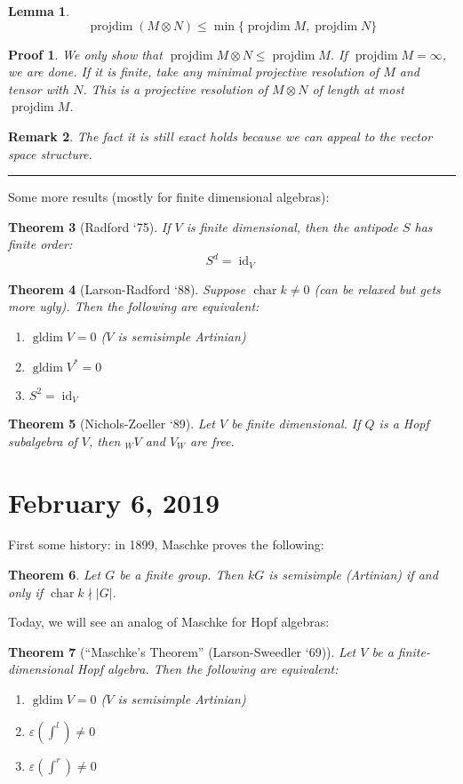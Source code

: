 \documentclass[12pt]{article}
\theoremstyle{break}
\theoremstyle{nonumberbreak}
\theoremstyle{changebreak}
\newtheorem{thm}{Theorem}[subsection]
\newtheorem{lem}[thm]{Lemma}
\theoremstyle{break}
\theoremstyle{nonumberbreak}
\newtheorem{prf}{Proof}
\theoremstyle{nonumberplain}
\theoremstyle{change}
\newtheorem{rmk}[thm]{Remark}
\newcommand*{\brk}{
\rule{2in}{.1pt}
}
\DeclareMathOperator{\gldim}{gldim}
\DeclareMathOperator{\projdim}{projdim}
\DeclareMathOperator{\ch}{char}
\DeclareMathOperator{\id}{id}
\begin{document}
\begin{lem}\label{lem-tensorproj}
	\[\projdim(M\otimes N)\le \min\{\projdim M,\projdim N\}\]
\end{lem}
\begin{prf}
	We only show that $\projdim M\otimes N\le \projdim M$. If $\projdim M=\infty$, we are done.
	If it is finite, take any minimal projective resolution of $M$ and tensor with $N$. This is a projective 
	resolution of $M\otimes N$ of length at most $\projdim M$. 
\end{prf}
\begin{rmk}
	The fact it is still exact holds because we can appeal to the vector space structure.
\end{rmk}

\brk

Some more results (mostly for finite dimensional algebras):
\begin{thm}[Radford `75]
	If $V$ is finite dimensional, then the antipode $S$ has finite order:
	\[S^d=\id_V\]
\end{thm}
\begin{thm}[Larson-Radford `88]\label{thm-LR88}
	Suppose $\ch k\ne 0$ (can be relaxed but gets more ugly). Then the following are equivalent:
	\begin{enumerate}
		\item $\gldim V=0$ ($V$ is semisimple Artinian)
		\item $\gldim V^*=0$
		\item $S^2=\id_V$
	\end{enumerate}
\end{thm}
\begin{thm}[Nichols-Zoeller `89]
	Let $V$ be finite dimensional. If $Q$ is a Hopf subalgebra of $V$, then $_WV$ and $V_W$ are free.
\end{thm}

\section{February 6, 2019}
First some history: in 1899, Maschke proves the following:
\begin{thm}
	Let $G$ be a finite group. Then $kG$ is semisimple (Artinian) if and only if $\ch k\nmid |G|$.
\end{thm}
Today, we will see an analog of Maschke for Hopf algebras:
\begin{thm}[``Maschke's Theorem'' (Larson-Sweedler `69)]
	Let $V$ be a finite-dimensional Hopf algebra. Then the following are equivalent:
	\begin{enumerate}
		\item $\gldim V = 0$ ($V$ is semisimple Artinian)
		\item $\varepsilon(\int^l)\ne 0$
		\item $\varepsilon(\int^r)\ne 0$
	\end{enumerate}
\end{thm}
\end{document}
